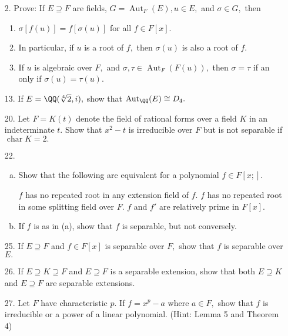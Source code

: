 \documentclass{article}
\DeclareMathOperator{\cha}{char}
\DeclareMathOperator{\Aut}{Aut}
\begin{document}
\begin{itemize}
	\item[2.] Prove: If $E\supseteq F$ are fields, $G=\Aut_F(E), u\in E,$ and $\sigma\in G,$ then
		\begin{enumerate}[(1)]
			\item $\sigma[f(u)] = f[\sigma(u)]$ for all $f\in F[x].$
				
			\item In particular, if $u$ is a root of $f,$ then $\sigma(u)$ is also a root of $f.$

			\item If $u$ is algebraic over $F,$ and $\sigma, \tau\in \Aut_F\left( F(u) \right),$ then $\sigma=\tau$ if an only if $\sigma(u)=\tau(u).$
				
		\end{enumerate}

	\item[13.] If $E=\QQ(\sqrt[4]{2}, i),$ show that $\Aut_{\QQ}(E)\cong D_4.$

	\item[20.] Let $F=K(t)$ denote the field of rational forms over a field $K$ in an indeterminate $t.$ Show that $x^2-t$ is irreducible over $F$ but is not separable if $\cha K=2.$

	\item[22.] \begin{enumerate}[(a)]
			\item Show that the following are equivalent for a polynomial $f\in F[x;].$ 
				\begin{enumerate}[(1)]
					\ii $f$ has no repeated root in any extension field of $f.$
					\ii $f$ has no repeated root in some splitting field over $F.$
					\ii $f$ and $f'$ are relatively prime in $F[x].$
				\end{enumerate}

			\item If $f$ is as in (a), show that $f$ is separable, but not conversely.
				
		\end{enumerate}

	\item[25.] If $E\supseteq F$ and $f\in F[x]$ is separable over $F,$ show that $f$ is separable over $E.$

	\item[26.] If $E\supseteq K\supseteq F$ and $E\supseteq F$ is a separable extension, show that both $E\supseteq K$ and $E\supseteq F$ are separable extensions.

	\item[27.] Let $F$ have characteristic $p.$ If $f=x^p-a$ where $a\in F,$ show that $f$ is irreducible or a power of a linear polynomial. (Hint: Lemma 5 and Theorem 4)
		
\end{itemize}
\end{document}
